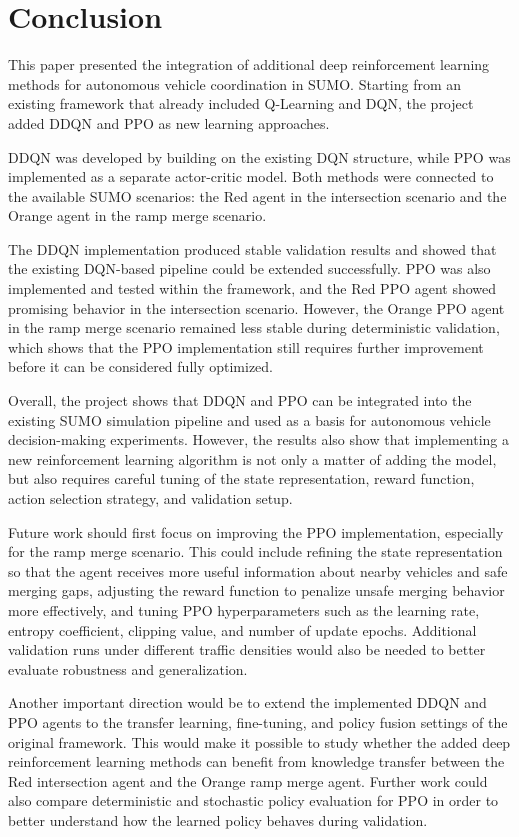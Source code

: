 \documentclass{article}
\begin{document}
\section{Conclusion}

This paper presented the integration of additional deep reinforcement learning methods for autonomous vehicle coordination in SUMO. Starting from an existing framework that already included Q-Learning and DQN, the project added DDQN and PPO as new learning approaches.

DDQN was developed by building on the existing DQN structure, while PPO was implemented as a separate actor-critic model. Both methods were connected to the available SUMO scenarios: the Red agent in the intersection scenario and the Orange agent in the ramp merge scenario.

The DDQN implementation produced stable validation results and showed that the existing DQN-based pipeline could be extended successfully. PPO was also implemented and tested within the framework, and the Red PPO agent showed promising behavior in the intersection scenario. However, the Orange PPO agent in the ramp merge scenario remained less stable during deterministic validation, which shows that the PPO implementation still requires further improvement before it can be considered fully optimized.

Overall, the project shows that DDQN and PPO can be integrated into the existing SUMO simulation pipeline and used as a basis for autonomous vehicle decision-making experiments. However, the results also show that implementing a new reinforcement learning algorithm is not only a matter of adding the model, but also requires careful tuning of the state representation, reward function, action selection strategy, and validation setup.

Future work should first focus on improving the PPO implementation, especially for the ramp merge scenario. This could include refining the state representation so that the agent receives more useful information about nearby vehicles and safe merging gaps, adjusting the reward function to penalize unsafe merging behavior more effectively, and tuning PPO hyperparameters such as the learning rate, entropy coefficient, clipping value, and number of update epochs. Additional validation runs under different traffic densities would also be needed to better evaluate robustness and generalization.

Another important direction would be to extend the implemented DDQN and PPO agents to the transfer learning, fine-tuning, and policy fusion settings of the original framework. This would make it possible to study whether the added deep reinforcement learning methods can benefit from knowledge transfer between the Red intersection agent and the Orange ramp merge agent. Further work could also compare deterministic and stochastic policy evaluation for PPO in order to better understand how the learned policy behaves during validation.






\end{document}
